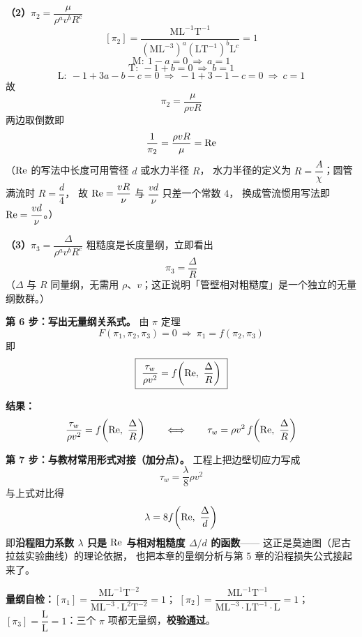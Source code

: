 \begin{jie}
\textbf{（2）$\pi_2=\dfrac{\mu}{\rho^{a}v^{b}R^{c}}$}
\[ [\pi_2]=\frac{\mathrm{ML^{-1}T^{-1}}}
   {\left(\mathrm{ML^{-3}}\right)^{a}\left(\mathrm{LT^{-1}}\right)^{b}\mathrm{L}^{c}}=1 \]
\[ \mathrm{M}:\ 1-a=0\ \Longrightarrow\ a=1 \]
\[ \mathrm{T}:\ -1+b=0\ \Longrightarrow\ b=1 \]
\[ \mathrm{L}:\ -1+3a-b-c=0\ \Longrightarrow\ -1+3-1-c=0
   \ \Longrightarrow\ c=1 \]
故
\[ \pi_2=\frac{\mu}{\rho v R} \]
两边取倒数即
\[ \frac{1}{\pi_2}=\frac{\rho v R}{\mu}=\mathrm{Re} \]
（$\mathrm{Re}$ 的写法中长度可用管径 $d$ 或水力半径 $R$，
水力半径的定义为 $R=\dfrac{A}{\chi}$；圆管满流时 $R=\dfrac{d}{4}$，
故 $\mathrm{Re}=\dfrac{vR}{\nu}$ 与 $\dfrac{vd}{\nu}$ 只差一个常数 $4$，
换成管流惯用写法即 $\mathrm{Re}=\dfrac{vd}{\nu}$。）

\textbf{（3）$\pi_3=\dfrac{\Delta}{\rho^{a}v^{b}R^{c}}$}
粗糙度是长度量纲，立即看出
\[ \pi_3=\frac{\Delta}{R} \]
（$\Delta$ 与 $R$ 同量纲，无需用 $\rho$、$v$；这正说明「管壁相对粗糙度」是一个独立的无量纲数群。）

\textbf{第 6 步：写出无量纲关系式。}
由 $\pi$ 定理
\[ F(\pi_1,\pi_2,\pi_3)=0\ \Longrightarrow\
   \pi_1=f(\pi_2,\pi_3) \]
即
\[ \boxed{\ \frac{\tau_w}{\rho v^{2}}
   =f\!\left(\mathrm{Re},\ \frac{\Delta}{R}\right)\ } \]

\textbf{结果：}
\[ \frac{\tau_w}{\rho v^{2}}=f\!\left(\Rey,\ \frac{\Delta}{R}\right)
   \qquad\Longleftrightarrow\qquad
   \tau_w=\rho v^{2}\,f\!\left(\Rey,\ \frac{\Delta}{R}\right) \]

\textbf{第 7 步：与教材常用形式对接（加分点）。}
工程上把边壁切应力写成
\[ \tau_w=\frac{\lambda}{8}\rho v^{2} \]
与上式对比得
\[ \lambda=8f\!\left(\Rey,\ \frac{\Delta}{d}\right) \]
即\textbf{沿程阻力系数 $\lambda$ 只是 $\mathrm{Re}$ 与相对粗糙度 $\Delta/d$ 的函数}——
这正是莫迪图（尼古拉兹实验曲线）的理论依据，
也把本章的量纲分析与第 5 章的沿程损失公式接起来了。

\textbf{量纲自检：}$[\pi_1]=\dfrac{\mathrm{ML^{-1}T^{-2}}}{\mathrm{ML^{-3}}\cdot\mathrm{L^{2}T^{-2}}}=1$；
$[\pi_2]=\dfrac{\mathrm{ML^{-1}T^{-1}}}{\mathrm{ML^{-3}}\cdot\mathrm{LT^{-1}}\cdot\mathrm{L}}=1$；
$[\pi_3]=\dfrac{\mathrm{L}}{\mathrm{L}}=1$：三个 $\pi$ 项都无量纲，\textbf{校验通过}。
\end{jie}


